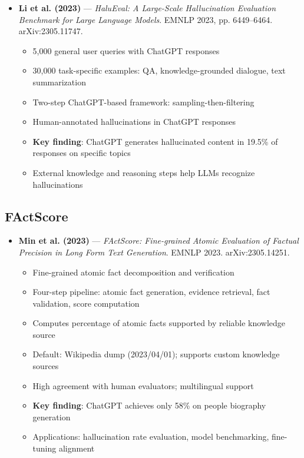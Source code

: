 \documentclass[11pt,letterpaper]{article}
\begin{document}
\begin{itemize}[leftmargin=*]
\item \textbf{Li et al. (2023)} --- \textit{HaluEval: A Large-Scale Hallucination Evaluation Benchmark for Large Language Models}. EMNLP 2023, pp. 6449--6464. arXiv:2305.11747.
  \begin{itemize}
  \item 5,000 general user queries with ChatGPT responses
  \item 30,000 task-specific examples: QA, knowledge-grounded dialogue, text summarization
  \item Two-step ChatGPT-based framework: sampling-then-filtering
  \item Human-annotated hallucinations in ChatGPT responses
  \item \textbf{Key finding}: ChatGPT generates hallucinated content in 19.5\% of responses on specific topics
  \item External knowledge and reasoning steps help LLMs recognize hallucinations
  \end{itemize}
\end{itemize}

\subsection{FActScore}

\begin{itemize}[leftmargin=*]
\item \textbf{Min et al. (2023)} --- \textit{FActScore: Fine-grained Atomic Evaluation of Factual Precision in Long Form Text Generation}. EMNLP 2023. arXiv:2305.14251.
  \begin{itemize}
  \item Fine-grained atomic fact decomposition and verification
  \item Four-step pipeline: atomic fact generation, evidence retrieval, fact validation, score computation
  \item Computes percentage of atomic facts supported by reliable knowledge source
  \item Default: Wikipedia dump (2023/04/01); supports custom knowledge sources
  \item High agreement with human evaluators; multilingual support
  \item \textbf{Key finding}: ChatGPT achieves only 58\% on people biography generation
  \item Applications: hallucination rate evaluation, model benchmarking, fine-tuning alignment
  \end{itemize}
\end{itemize}
\end{document}
